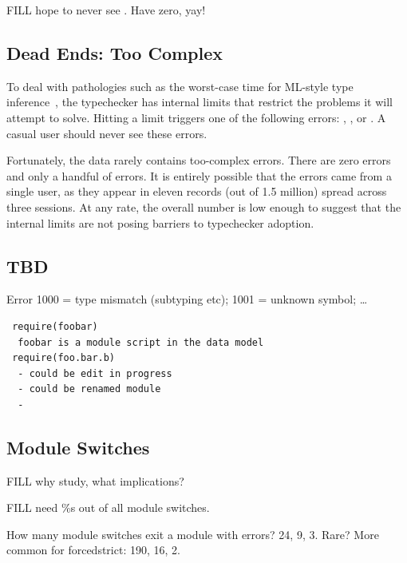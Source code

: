 \documentclass[english,submission,cleveref]{programming}
\begin{document}
FILL hope to never see .
Have zero, yay!


\subsection{Dead Ends: Too Complex}

To deal with pathologies such as the worst-case time for ML-style type
inference~\cite{m-popl-1990,ktu-caap-1990}, the typechecker
has internal limits that restrict the problems it will attempt to solve.
Hitting a limit triggers one of the following errors:
,
, or
.
A casual user should never see these errors.

Fortunately, the data rarely contains too-complex errors.
There are zero  errors and only a
handful of  errors.
It is entirely possible that the  errors came from
a single user, as they appear in eleven records (out of 1.5 million)
spread across three sessions.
At any rate, the overall number is low enough to suggest that the internal
limits are not posing barriers to typechecker adoption.


\subsection{TBD}

Error 1000 = type mismatch (subtyping etc);
1001 = unknown symbol;
\ldots



\begin{verbatim}
 require(foobar)
  foobar is a module script in the data model
 require(foo.bar.b)
  - could be edit in progress
  - could be renamed module
  - 
\end{verbatim}


\subsection{Module Switches}

FILL why study, what implications?

FILL need \%s out of all module switches.

How many module switches exit a module with errors?
\mnocheck{} 24, \mnonstrict{} 9, \mstrict{} 3.
Rare?
More common for forcedstrict:
 \mnocheck{} 190, \mnonstrict{} 16, \mstrict{} 2.
\end{document}
